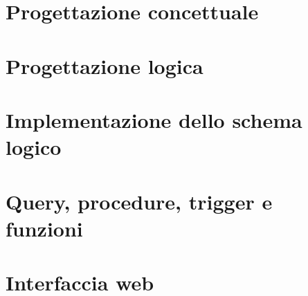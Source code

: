 \documentclass[a4paper,twoside]{article}
\begin{document}
\section{Progettazione concettuale}

\section{Progettazione logica}

\section{Implementazione dello schema logico}

\section{Query, procedure, trigger e funzioni}

\section{Interfaccia web}
\end{document}
